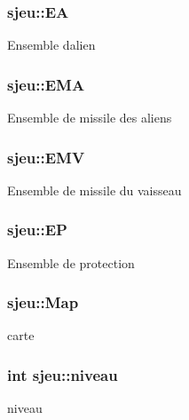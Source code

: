 \subsubsection[{\texorpdfstring{EA}{EA}}]{ sjeu\+::\+EA}\hypertarget{structsjeu_add6abf2e70714430efb1108a0f63daf0}{}\label{structsjeu_add6abf2e70714430efb1108a0f63daf0}
Ensemble d\textquotesingle{}alien 
\subsubsection[{\texorpdfstring{E\+MA}{EMA}}]{ sjeu\+::\+E\+MA}\hypertarget{structsjeu_af19408961a6725fe4685d1c01ec8a2d9}{}\label{structsjeu_af19408961a6725fe4685d1c01ec8a2d9}
Ensemble de missile des aliens 
\subsubsection[{\texorpdfstring{E\+MV}{EMV}}]{ sjeu\+::\+E\+MV}\hypertarget{structsjeu_a6a19047799eb7951b5451deea2dd39a0}{}\label{structsjeu_a6a19047799eb7951b5451deea2dd39a0}
Ensemble de missile du vaisseau 
\subsubsection[{\texorpdfstring{EP}{EP}}]{ sjeu\+::\+EP}\hypertarget{structsjeu_ac4a070a02abe19dc3282f458b71f5186}{}\label{structsjeu_ac4a070a02abe19dc3282f458b71f5186}
Ensemble de protection 
\subsubsection[{\texorpdfstring{Map}{Map}}]{ sjeu\+::\+Map}\hypertarget{structsjeu_a3eee98c8fb0632fb0350d497e6ad4776}{}\label{structsjeu_a3eee98c8fb0632fb0350d497e6ad4776}
carte 
\subsubsection[{\texorpdfstring{niveau}{niveau}}]{\setlength{\rightskip}{0pt plus 5cm}int sjeu\+::niveau}\hypertarget{structsjeu_a7bb23f0ca4e1c3c0161222bcdddc4dae}{}\label{structsjeu_a7bb23f0ca4e1c3c0161222bcdddc4dae}
niveau 
